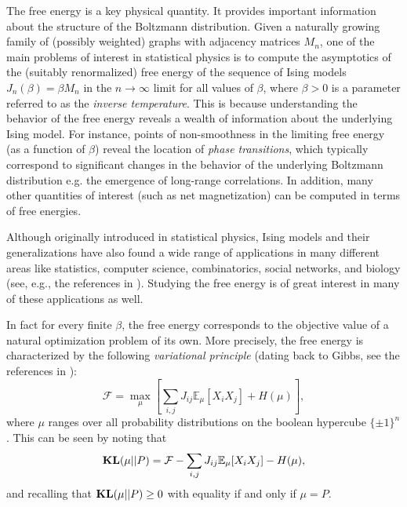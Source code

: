 \documentclass[final, 12pt]{colt2018}
\newcommand{\bE}{\mathbb{E}}
\newcommand{\F}{\mathcal{F}}
\newcommand{\E}{\bE}      %
\newcommand{\KL}{\mathop{\bf KL\/}}
\theoremstyle{definition}
\theoremstyle{plain}
\begin{document}
The free energy is a key physical quantity. It provides important information %
about the structure of the Boltzmann distribution. Given a naturally growing family of (possibly weighted) graphs with adjacency matrices $M_n$, %
one of the main problems of interest in statistical physics is to compute the asymptotics of the (suitably renormalized) free energy of the sequence of Ising models $J_n(\beta) = \beta M_n$ in the $n \to \infty$ limit for all values of $\beta$, where $\beta > 0$ is a parameter referred to as the \emph{inverse temperature}. This is because understanding the behavior of the free energy reveals a wealth of information about the underlying Ising model. For instance, points of non-smoothness in the limiting free energy (as a function of $\beta$) reveal the location of \emph{phase transitions}, which typically correspond to significant
changes in the behavior of the underlying Boltzmann distribution e.g. the emergence of long-range correlations. In addition, many other quantities of interest (such as net magnetization) can be computed in terms of free energies.

Although originally introduced in statistical physics, Ising models and their generalizations have also found a wide range of applications in many different areas like statistics, computer science, combinatorics, social networks, and biology (see, e.g., the references in \citet{basak2017universality}). Studying the free energy is of great interest in many of these applications as well. 

In fact for every finite $\beta$, the free energy corresponds
to the objective value of a natural optimization problem of its own.
More precisely, the free energy is characterized by the following \emph{variational principle} (dating back to Gibbs, see the references in \citet{ellis2007entropy}):
\begin{equation}
\label{eqn:free-energy-variational-char}
\F = \max_{\mu} \left[\sum_{i,j} J_{ij} \E_{\mu}[X_i X_j] + H(\mu)\right],
\end{equation}
where $\mu$ ranges over all probability distributions on the boolean hypercube $\{\pm 1\}^{n}$. This can be seen by noting that 
\begin{equation}
\label{eqn:free-energy-KL}
\KL(\mu ||P)=\F - \sum_{i,j} J_{ij} \E_{\mu}[X_i X_j] - H(\mu),
\end{equation}
and recalling that $\KL(\mu ||P) \geq 0$ with equality if and only if $\mu = P$.
 
\end{document}
